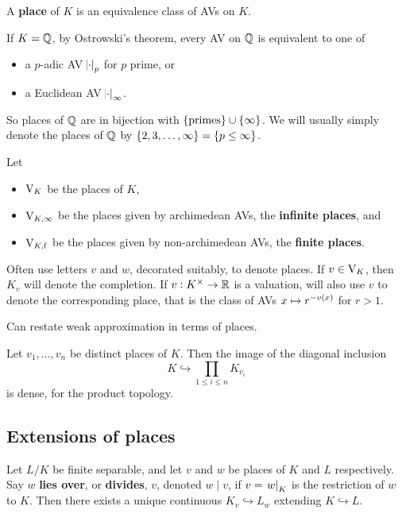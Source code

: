 \begin{definition*}
A \textbf{place} of $ K $ is an equivalence class of AVs on $ K $.
\end{definition*}

\begin{example*}
If $ K = \mathbb{Q} $, by Ostrowski's theorem, every AV on $ \mathbb{Q} $ is equivalent to one of
\begin{itemize}
\item a $ p $-adic AV $ \abs{\cdot}_p $ for $ p $ prime, or
\item a Euclidean AV $ \abs{\cdot}_\infty $.
\end{itemize}
So places of $ \mathbb{Q} $ are in bijection with $ \cbr{\text{primes}} \cup \cbr{\infty} $. We will usually simply denote the places of $ \mathbb{Q} $ by $ \cbr{2, 3, \dots, \infty} = \cbr{p \le \infty} $.
\end{example*}

\begin{notation*}
Let
\begin{itemize}
\item $ \mathrm{V}_K $ be the places of $ K $,
\item $ \mathrm{V}_{K, \infty} $ be the places given by archimedean AVs, the \textbf{infinite places}, and
\item $ \mathrm{V}_{K, \mathrm{f}} $ be the places given by non-archimedean AVs, the \textbf{finite places}.
\end{itemize}
Often use letters $ v $ and $ w $, decorated suitably, to denote places. If $ v \in \mathrm{V}_K $, then $ K_v $ will denote the completion. If $ v : K^\times \to \mathbb{R} $ is a valuation, will also use $ v $ to denote the corresponding place, that is the class of AVs $ x \mapsto r^{-v\br{x}} $ for $ r > 1 $.
\end{notation*}

Can restate weak approximation in terms of places.

\begin{proposition}
Let $ v_1, \dots, v_n $ be distinct places of $ K $. Then the image of the diagonal inclusion
$$ K \hookrightarrow \prod_{1 \le i \le n} K_{v_i} $$
is dense, for the product topology.
\end{proposition}

\pagebreak

\subsection{Extensions of places}

Let $ L / K $ be finite separable, and let $ v $ and $ w $ be places of $ K $ and $ L $ respectively. Say $ w $ \textbf{lies over}, or \textbf{divides}, $ v $, denoted $ w \mid v $, if $ v = \left. w \right|_K $ is the restriction of $ w $ to $ K $. Then there exists a unique continuous $ K_v \hookrightarrow L_w $ extending $ K \hookrightarrow L $.


